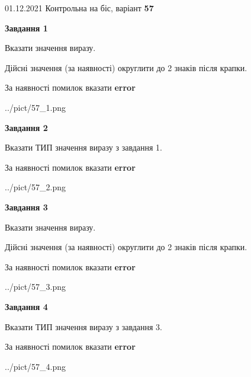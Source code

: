 \documentclass[11pt, ukrainian]{article}
\begin{document}
{01.12.2021 Контрольна на біс, варіант  \No \textbf { 57 }\par}
{
\begin {large}
{\begin {center}\textbf{Завдання 1}\end {center}}\par
Вказати значення виразу. \par
Дійсні значення (за наявності) округлити до 2 знаків після крапки. \par
За наявності помилок вказати \textbf{error}

\begin{center}
	{../pict/57_1.png}
\end{center}
\newpage

{\begin {center}\textbf{Завдання 2}\end {center}}\par
Вказати ТИП значення виразу з завдання 1. \par
За наявності помилок вказати \textbf{error}

\begin{center}
	{../pict/57_2.png}
\end{center}
\newpage

{\begin {center}\textbf{Завдання 3}\end {center}}\par
Вказати значення виразу. \par
Дійсні значення (за наявності) округлити до 2 знаків після крапки. \par
За наявності помилок вказати \textbf{error}

\begin{center}
	{../pict/57_3.png}
\end{center}
\newpage

{\begin {center}\textbf{Завдання 4}\end {center}}\par
Вказати ТИП значення виразу з завдання 3. \par
За наявності помилок вказати \textbf{error}

\begin{center}
	{../pict/57_4.png}
\end{center}
\newpage


\end{large}}
\end{document}

